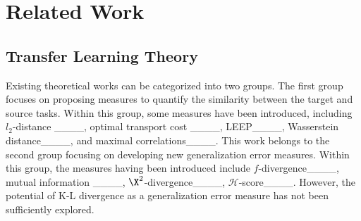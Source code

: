 \section{Related Work}
\subsection{Transfer Learning Theory}
Existing theoretical works can be categorized into two groups. The first group focuses on proposing measures to quantify the similarity between the target and source tasks. Within this group, some measures have been introduced, including $l_2$-distance  ____, optimal transport cost  ____, 
LEEP____, Wasserstein distance____, and maximal correlations____. 
This work belongs to the second group focusing on developing new generalization error measures. Within this group, the measures 
having been introduced include $f$-divergence____,  mutual information 
____, $\X^2$-divergence____, $\mathcal{H}$-score____. 
However, the potential of K-L divergence as a generalization error measure has not been sufficiently explored. 


